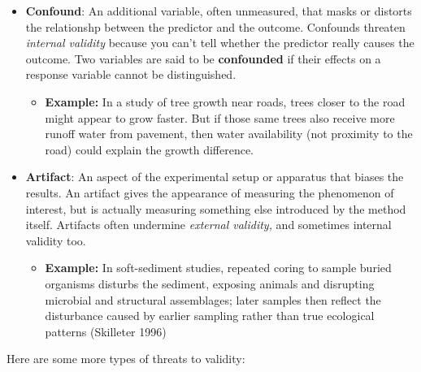 \documentclass[
  letterpaper,
  DIV=11,
  numbers=noendperiod]{scrreprt}
\providecommand{\tightlist}{%
  \setlength{\itemsep}{0pt}\setlength{\parskip}{0pt}}
\begin{document}
\begin{itemize}
\item
  \textbf{Confound}: An additional variable, often unmeasured, that
  masks or distorts the relationshp between the predictor and the
  outcome. Confounds threaten \emph{internal validity} because you can't
  tell whether the predictor really causes the outcome. Two variables
  are said to be \textbf{confounded} if their effects on a response
  variable cannot be distinguished.

  \begin{itemize}
  \tightlist
  \item
    \textbf{Example:} In a study of tree growth near roads, trees closer
    to the road might appear to grow faster. But if those same trees
    also receive more runoff water from pavement, then water
    availability (not proximity to the road) could explain the growth
    difference.
  \end{itemize}
\item
  \textbf{Artifact}: An aspect of the experimental setup or apparatus
  that biases the results. An artifact gives the appearance of measuring
  the phenomenon of interest, but is actually measuring something else
  introduced by the method itself. Artifacts often undermine
  \emph{external validity,} and sometimes internal validity too.

  \begin{itemize}
  \tightlist
  \item
    \textbf{Example:} In soft-sediment studies, repeated coring to
    sample buried organisms disturbs the sediment, exposing animals and
    disrupting microbial and structural assemblages; later samples then
    reflect the disturbance caused by earlier sampling rather than true
    ecological patterns (Skilleter 1996)
  \end{itemize}
\end{itemize}

Here are some more types of threats to validity:
\end{document}
